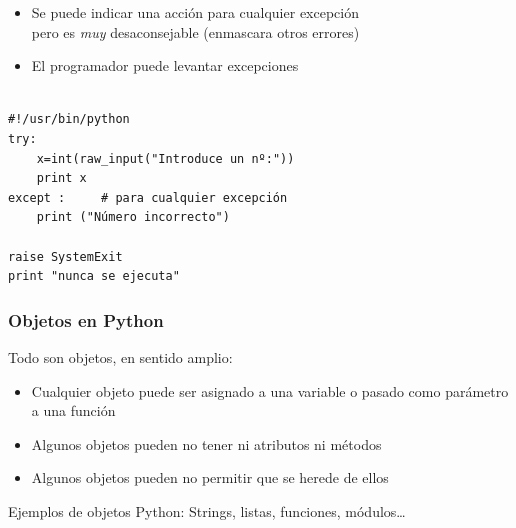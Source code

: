 \documentclass{beamer}
\begin{document}
\begin{frame}[fragile]

\begin{itemize}
\item Se puede indicar una acción para cualquier excepción\\
      pero es \emph{muy} desaconsejable (enmascara otros errores)
\item  El programador puede levantar excepciones
\end{itemize}

  \begin{footnotesize}
\begin{verbatim}

#!/usr/bin/python
try:
    x=int(raw_input("Introduce un nº:"))
    print x
except :     # para cualquier excepción
    print ("Número incorrecto")

raise SystemExit
print "nunca se ejecuta"
\end{verbatim}
  \end{footnotesize}


\end{frame}









\begin{frame}
\frametitle{Objetos en Python}

Todo son objetos, en sentido amplio:
\begin{itemize}
\item Cualquier objeto puede ser asignado a una variable o pasado como
  parámetro a una función
\item Algunos objetos pueden no tener ni atributos ni métodos
\item Algunos objetos pueden no permitir que se herede de ellos
\end{itemize}

Ejemplos de objetos Python: Strings, listas, funciones, módulos\ldots
\end{frame}
\end{document}
